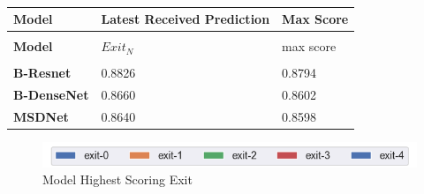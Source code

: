 \begin{minipage}[t]{\linewidth}
	\begin{longtabu}{>{\bfseries}X|X|X}
		\caption[]{} \label{tbl:latest-vs-max} \\
		\toprule
		\rowfont{\bfseries}
		Model & Latest Received Prediction & Max Score   \tabularnewline
		\bottomrule
		\endfirsthead
		\\
		\toprule
		\rowfont{\bfseries}
		Model & $Exit_N$ & max score    \tabularnewline
		\bottomrule
		\endhead %
		\bottomrule
		\\
		\endfoot
		\hline
		\endlastfoot
		B-Resnet	& 0.8826	& 0.8794  \tabularnewline
		\hline
		B-DenseNet	& 0.8660 	& 0.8602 \tabularnewline
		\hline
		MSDNet		& 0.8640 	& 0.8598 \tabularnewline							
		\bottomrule
	\end{longtabu}
\end{minipage}
\begin{figure}
	\captionsetup[subfigure]{justification=centering}
	\centering
	\includegraphics[width=.7\linewidth]{figures/edge/exit0-4_legend}
	\hfill
	\hfill
	\caption[Model Highest Scoring Exit]{Model Highest Scoring Exit}
	\label{fig:exit-highscore}
\end{figure}
